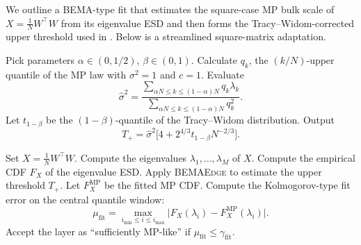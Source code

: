 \documentclass[11pt]{article}
\theoremstyle{plain}
\theoremstyle{definition}
\theoremstyle{remark}
\newcommand{\1}{\mathbf{1}}
\begin{document}
We outline a BEMA-type fit that estimates the square-case MP bulk scale of \(X=\frac1N W^\top W\) from its eigenvalue ESD and then forms the Tracy--Widom-corrected upper threshold used in \cite{ke2021estimation}. Below is a streamlined square-matrix adaptation.

\begin{algorithm}[H]
\caption{Computing a BEMA-type upper threshold \(T_+\) using MP and Tracy--Widom corrections}
\label{BEMA_algo}
\begin{algorithmic}[1]
\State Pick parameters \(\alpha\in(0,1/2)\), \(\beta\in(0,1)\).
    \State Calculate \(q_k\), the \((k/N)\)-upper quantile of the MP law with \(\sigma^2=1\) and \(c=1\).
\EndFor
\State Evaluate
\[
\widehat{\sigma}^2
=
\frac{\sum_{\alpha N\le k\le (1-\alpha)N} q_k\lambda_k}
     {\sum_{\alpha N\le k\le (1-\alpha)N} q_k^2}.
\]
\State Let \(t_{1-\beta}\) be the \((1-\beta)\)-quantile of the Tracy--Widom distribution.
\State Output
\[
T_+
=
\widehat{\sigma}^2
\big[4+2^{4/3}t_{1-\beta}N^{-2/3}\big].
\]
\EndProcedure
\end{algorithmic}
\end{algorithm}

\begin{algorithm}[H]
\caption{Spectral analysis using a BEMA-type fit}
\label{algo:bema_fit}
\begin{algorithmic}[1]
\State Set \(X=\frac1N W^\top W\).
\State Compute the eigenvalues \(\lambda_1,\dots,\lambda_M\) of \(X\).
\State Compute the empirical CDF \(F_X\) of the eigenvalue ESD.
\State Apply \textsc{BEMAEdge} to estimate the upper threshold \(T_+\).
\State Let \(F_X^{\mathrm{MP}}\) be the fitted MP CDF.
\State Compute the Kolmogorov-type fit error on the central quantile window:
\[
\mu_{\mathrm{fit}}
=
\max_{i_{\min}\le i\le i_{\max}}
\big|F_X(\lambda_i)-F_X^{\mathrm{MP}}(\lambda_i)\big|.
\]
\State Accept the layer as ``sufficiently MP-like'' if \(\mu_{\mathrm{fit}}\le \gamma_{\mathrm{fit}}\).
\EndProcedure
\end{algorithmic}
\end{algorithm}
\end{document}
